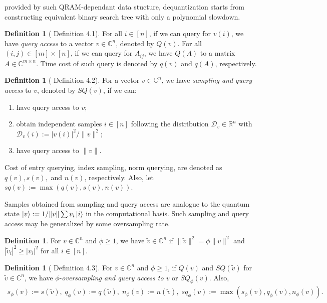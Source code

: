 \documentclass[10pt,twoside,reqno]{amsart} %
\theoremstyle{plain}
\theoremstyle{definition}
\newtheorem{defn}[thm]{Definition}
\begin{document}
provided by such QRAM-dependant data stucture, dequantization starts
from constructing equivalent binary search tree with only a polynomial
slowdown.
\begin{defn}[\cite{tang2023} Definition 4.1]
  For all $i\in[n]$, if we can query for $v(i)$, we have \emph{query access}
  to a vector $v\in\mathbb{C}^n$, denoted by $Q(v)$. For all 
  $(i,j)\in[m]\times[n]$, if we can query for $A_{ij}$, we have $Q(A)$ to
  a matrix $A\in\mathbb{C}^{m\times n}$. Time cost of such query is denoted
  by $q(v)$ and $q(A)$, respectively.
\end{defn}
\begin{defn}[\cite{tang2023} Definition 4.2]
  For a vector $v\in\mathbb{C}^n$, we have \emph{sampling and query access} to
  $v$, denoted by $SQ(v)$, if we can:
  \begin{enumerate}
    \item have query access to $v$;
    \item obtain independent samples $i\in[n]$ following the distribution
      $\mathcal{D}_v\in\mathbb{R}^n$ with $\mathcal{D}_v(i):=|v(i)|^2/\|v\|^2$;
    \item have query access to $\|v\|$.
  \end{enumerate}
  Cost of entry querying, index sampling, norm querying, are denoted as
  $q(v),s(v),$ and $n(v)$, respectively. Also, let $sq(v):=\max(q(v),s(v),n(v))$.
\end{defn}
Samples obtained from sampling and query access are analogue to the quantum
state $\ket{v} := 1/\|v\|\sum v_i\ket{i}$ in the computational basis. Such
sampling and query access may be generalized by some oversampling rate.
\begin{defn}
  For $v\in\mathbb{C}^n$ and $\phi\geq1$, we have
  $\widetilde{v}\in\mathbb{C}^n$ if $\|\widetilde{v}\|^2=\phi\|v\|^2$ and
  $|\widetilde{v}_i|^2\geq |v_i|^2$ for all $i\in[n]$.
\end{defn}
\begin{defn}[\cite{tang2023} Definition 4.3]
  For $v\in\mathbb{C}^n$ and $\phi\geq1$, if $Q(v)$ and 
  $SQ(\widetilde{v})$ for $\widetilde{v}\in\mathbb{C}^n$, we have 
  $\phi$-\emph{oversampling and query access to $v$} or $SQ_{\phi}(v)$. Also,
  \begin{align*}
    s_{\phi}(v) := s(\widetilde{v}),\;
    q_{\phi}(v) := q(\widetilde{v}),\;
    n_{\phi}(v) := n(\widetilde{v}),\;
    sq_{\phi}(v) := \max(s_{\phi}(v),q_{\phi}(v),n_{\phi}(v)).
  \end{align*}
\end{defn}
\end{document}
